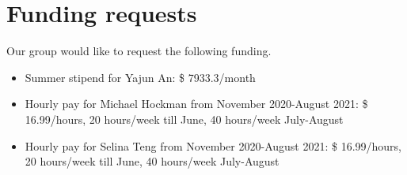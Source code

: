 \documentclass[12pt]{article}
\begin{document}
\section*{Funding requests}
Our group would like to request the following funding.

\begin{itemize}
\item Summer stipend for Yajun An: \$ 7933.3/month

\item Hourly pay for Michael Hockman from November 2020-August 2021: \$ 16.99/hours, 20 hours/week till June, 40 hours/week July-August

\item Hourly pay for Selina Teng from November 2020-August 2021: \$ 16.99/hours, 20 hours/week till June, 40 hours/week July-August
\end{itemize}

\newpage
\end{document}
